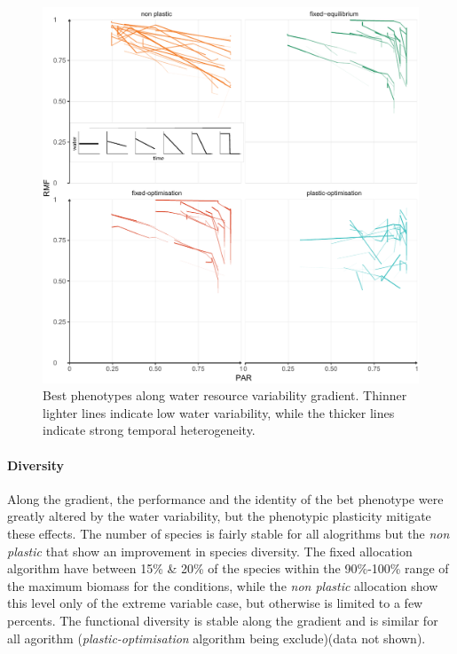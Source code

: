 \begin{figure}\label{fig:variable_trajectories}
\includegraphics[width = \textwidth]{./2_PP/Figures/Variable/var_2D_strat_dyn.pdf}
\caption[Best phenotypes along water resource variability gradient]{Best phenotypes along water resource variability gradient. Thinner lighter lines indicate low water variability, while the thicker lines indicate strong temporal heterogeneity.}
\end{figure}

\paragraph{Diversity}



Along the gradient, the performance and the identity of the bet phenotype were greatly altered by the water variability, but the phenotypic plasticity mitigate these effects. The number of species is fairly stable for all alogrithms but the \textit{non plastic} that show an improvement in species diversity. The fixed allocation algorithm have between 15\% \& 20\% of the species within the 90\%-100\% range of the maximum biomass for the conditions, while the \textit{non plastic} allocation show this level only of the extreme variable case, but otherwise is limited to a few percents. The functional diversity is stable along the gradient and is similar for all agorithm (\textit{plastic-optimisation} algorithm being exclude)(data not shown).

